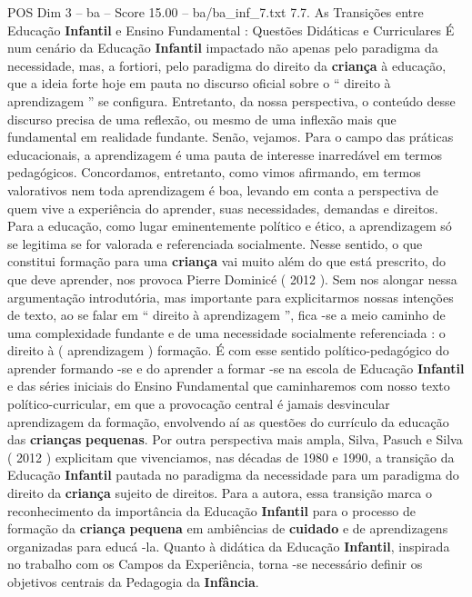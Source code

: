 \begin{textsample}{POS Dim 3 – ba – Score 15.00 – ba/ba\_inf\_7.txt}  \label{ex:f3_pos_177}
7.7.
As Transições entre Educação \textbf{Infantil} e Ensino Fundamental : Questões Didáticas e Curriculares É num cenário da Educação \textbf{Infantil} impactado não apenas pelo paradigma da necessidade, mas, a fortiori, pelo paradigma do direito da \textbf{criança} à educação, que a ideia forte hoje em pauta no discurso oficial sobre o “ direito à aprendizagem ” se configura.
Entretanto, da nossa perspectiva, o conteúdo desse discurso precisa de uma reflexão, ou mesmo de uma inflexão mais que fundamental em realidade fundante.
Senão, vejamos.
Para o campo das práticas educacionais, a aprendizagem é uma pauta de interesse inarredável em termos pedagógicos.
Concordamos, entretanto, como vimos afirmando, em termos valorativos nem toda aprendizagem é boa, levando em conta a perspectiva de quem vive a experiência do aprender, suas necessidades, demandas e direitos.
Para a educação, como lugar eminentemente político e ético, a aprendizagem só se legitima se for valorada e referenciada socialmente.
Nesse sentido, o que constitui formação para uma \textbf{criança} vai muito além do que está prescrito, do que deve aprender, nos provoca Pierre Dominicé ( 2012 ).
Sem nos alongar nessa argumentação introdutória, mas importante para explicitarmos nossas intenções de texto, ao se falar em “ direito à aprendizagem ”, fica -se a meio caminho de uma complexidade fundante e de uma necessidade socialmente referenciada : o direito à ( aprendizagem ) formação.
É com esse sentido político-pedagógico do aprender formando -se e do aprender a formar -se na escola de Educação \textbf{Infantil} e das séries iniciais do Ensino Fundamental que caminharemos com nosso texto político-curricular, em que a provocação central é jamais desvincular aprendizagem da formação, envolvendo aí as questões do currículo da educação das \textbf{crianças} \textbf{pequenas}.
Por outra perspectiva mais ampla, Silva, Pasuch e Silva ( 2012 ) explicitam que vivenciamos, nas décadas de 1980 e 1990, a transição da Educação \textbf{Infantil} pautada no paradigma da necessidade para um paradigma do direito da \textbf{criança} sujeito de direitos.
Para a autora, essa transição marca o reconhecimento da importância da Educação \textbf{Infantil} para o processo de formação da \textbf{criança} \textbf{pequena} em ambiências de \textbf{cuidado} e de aprendizagens organizadas para educá -la.
Quanto à didática da Educação \textbf{Infantil}, inspirada no trabalho com os Campos da Experiência, torna -se necessário definir os objetivos centrais da Pedagogia da \textbf{Infância}.

\end{textsample}
